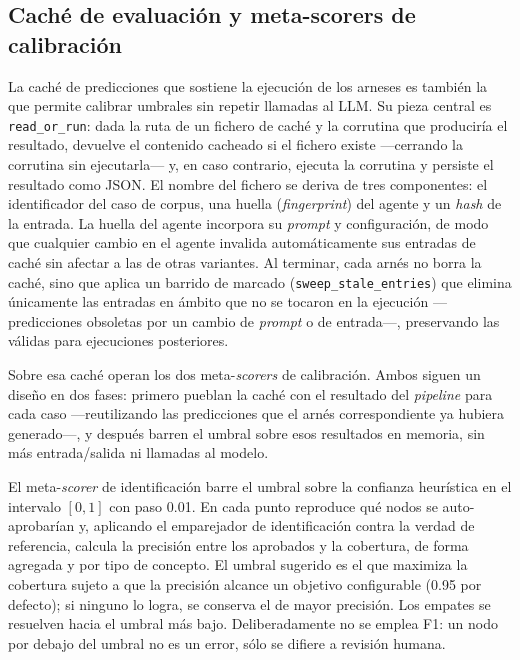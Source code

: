 \subsection{Caché de evaluación y meta-scorers de calibración}
\label{anx:cache-eval}

La caché de predicciones que sostiene la ejecución de los arneses es también la que permite
calibrar umbrales sin repetir llamadas al LLM. Su pieza central es \texttt{read\_or\_run}: dada la
ruta de un fichero de caché y la corrutina que produciría el resultado, devuelve el contenido
cacheado si el fichero existe —cerrando la corrutina sin ejecutarla— y, en caso contrario, ejecuta
la corrutina y persiste el resultado como JSON. El nombre del fichero se deriva de tres
componentes: el identificador del caso de corpus, una huella (\textit{fingerprint}) del agente y un
\textit{hash} de la entrada. La huella del agente incorpora su \textit{prompt} y configuración, de
modo que cualquier cambio en el agente invalida automáticamente sus entradas de caché sin afectar a
las de otras variantes. Al terminar, cada arnés no borra la caché, sino que aplica un barrido de
marcado (\texttt{sweep\_stale\_entries}) que elimina únicamente las entradas en ámbito que no se
tocaron en la ejecución —predicciones obsoletas por un cambio de \textit{prompt} o de entrada—,
preservando las válidas para ejecuciones posteriores.

Sobre esa caché operan los dos meta-\textit{scorers} de calibración. Ambos siguen un diseño en dos
fases: primero pueblan la caché con el resultado del \textit{pipeline} para cada caso —reutilizando
las predicciones que el arnés correspondiente ya hubiera generado—, y después barren el umbral
sobre esos resultados en memoria, sin más entrada/salida ni llamadas al modelo.

El meta-\textit{scorer} de identificación barre el umbral sobre la confianza heurística en el
intervalo $[0,1]$ con paso 0.01. En cada punto reproduce qué nodos se auto-aprobarían y, aplicando
el emparejador de identificación contra la verdad de referencia, calcula la precisión entre los
aprobados y la cobertura, de forma agregada y por tipo de concepto. El umbral sugerido es el que
maximiza la cobertura sujeto a que la precisión alcance un objetivo configurable (0.95 por
defecto); si ninguno lo logra, se conserva el de mayor precisión. Los empates se resuelven hacia el
umbral más bajo. Deliberadamente no se emplea F1: un nodo por debajo del umbral no es un error, sólo
se difiere a revisión humana.

